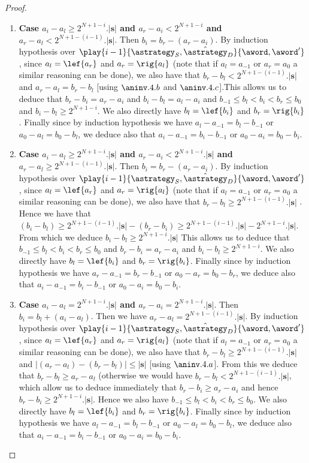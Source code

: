 \begin{proof}
\begin{enumerate}
\item \textbf{Case $a_i-a_l \geq 2^{N+1-i}.|\mathbf{s}|$ and $a_r-a_i < 2^{N+1-i}$ and $a_r-a_l < 2^{N+1-(i-1)}.|\mathbf{s}|$}. Then $b_i=b_r-(a_r-a_i)$.  By induction hypothesis over $\play{i-1}{\astrategy_S,\hat\astrategy_D}{\aword,\aword'}$, since $a_l=\lef{a_r}$ and $a_r=\rig{a_l}$ (note that if $a_l=a_{-1}$ or $a_r=a_0$ a similar reasoning can be done),  we also have that  $b_r-b_l < 2^{N+1-(i-1)}.|\mathbf{s}|$ and $a_r-a_l=b_r-b_l$ [using $\aninv.4.b$ and $\aninv.4.c$].This allows us to deduce that $b_r-b_i=a_r-a_i$ and $b_i-b_l=a_l-a_i$ and  $b_{-1} \leq b_l < b_i < b_r \leq b_0$ and $b_i-b_l \geq 2^{N+1-i}$. We also directly have $b_l=\lef{b_i}$ and $b_r=\rig{b_i}$. Finally since by induction hypothesis we have $a_{l}-a_{-1}=b_{l}-b_{-1}$ or $a_{0}-a_{l}=b_{0}-b_{l}$, we deduce also that $a_{i}-a_{-1}=b_{i}-b_{-1}$ or $a_{0}-a_{i}=b_{0}-b_{i}$.
\item \textbf{Case $a_i-a_l \geq 2^{N+1-i}.|\mathbf{s}|$ and $a_r-a_i < 2^{N+1-i}.|\mathbf{s}|$ and $a_r-a_l \geq 2^{N+1-(i-1)}.|\mathbf{s}|$}. Then $b_i=b_r-(a_r-a_i)$.  By induction hypothesis over $\play{i-1}{\astrategy_S,\hat\astrategy_D}{\aword,\aword'}$, since $a_l=\lef{a_r}$ and $a_r=\rig{a_l}$ (note that if $a_l=a_{-1}$ or $a_r=a_0$ a similar reasoning can be done),  we also have that  $b_r-b_l \geq  2^{N+1-(i-1)}.|\mathbf{s}|$ . Hence we have that $(b_i-b_l)\geq 2^{N+1-(i-1)}.|\mathbf{s}| - (b_r-b_i) \geq 2^{N+1-(i-1)}.|\mathbf{s}| -  2^{N+1-i}.|\mathbf{s}| $. From which we deduce $b_i-b_l\geq 2^{N+1-i}.|\mathbf{s}|$ This allows us to deduce that  $b_{-1} \leq b_l < b_i < b_r \leq b_0$ and $b_r-b_i=a_r-a_i$ and $b_i-b_l\geq 2^{N+1-i}$. We also directly have $b_l=\lef{b_i}$ and $b_r=\rig{b_i}$. Finally since by induction hypothesis we have $a_{r}-a_{-1}=b_{r}-b_{-1}$ or $a_{0}-a_{r}=b_{0}-b_{r}$, we deduce also that $a_{i}-a_{-1}=b_{i}-b_{-1}$ or $a_{0}-a_{i}=b_{0}-b_{i}$.
\item \textbf{Case $a_i-a_l = 2^{N+1-i}.|\mathbf{s}|$ and $a_r-a_i = 2^{N+1-i}.|\mathbf{s}|$}. Then $b_i=b_l+(a_i-a_l)$. Then we have $a_r-a_l= 2^{N+1-(i-1)}.|\mathbf{s}|$. By induction hypothesis over $\play{i-1}{\astrategy_S,\hat\astrategy_D}{\aword,\aword'}$, since $a_l=\lef{a_r}$ and $a_r=\rig{a_l}$ (note that if $a_l=a_{-1}$ or $a_r=a_0$ a similar reasoning can be done),  we also have that  $b_r-b_l \geq  2^{N+1-(i-1)}.|\mathbf{s}|$ and $|(a_r-a_l)-(b_r-b_l)| \leq |\mathbf{s}|$ [using $\aninv.4.a$]. From this we deduce that $b_r-b_l \geq a_r-a_l$ (otherwise we would have $b_r-b_l < 2^{N+1-(i-1)}.|\mathbf{s}|$, which allow us to deduce immediately that  $b_r-b_i \geq a_r-a_i$ and hence  $b_r-b_i \geq 2^{N+1-i}.|\mathbf{s}|$. Hence we also have  $b_{-1} \leq b_l < b_i < b_r \leq b_0$. We also directly have $b_l=\lef{b_i}$ and $b_r=\rig{b_i}$. Finally since by induction hypothesis we have $a_{l}-a_{-1}=b_{l}-b_{-1}$ or $a_{0}-a_{l}=b_{0}-b_{l}$, we deduce also that $a_{i}-a_{-1}=b_{i}-b_{-1}$ or $a_{0}-a_{i}=b_{0}-b_{i}$.

\end{enumerate}
\end{proof}
